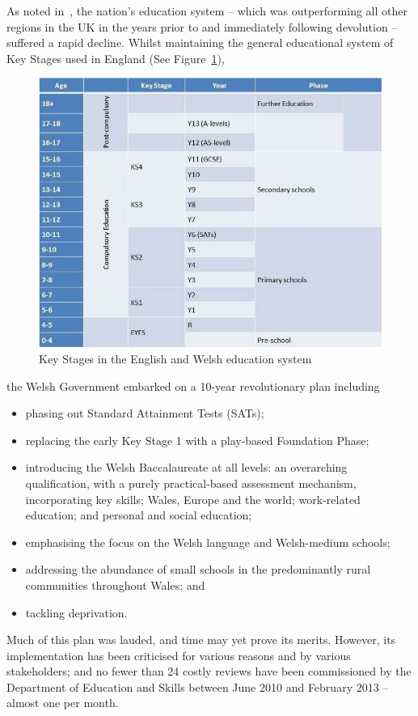 \documentclass{sig-alternate}
\begin{document}
As noted in~\cite{Evans:2015},
the nation's education system
-- which was outperforming all other regions in the UK
in the years prior to and immediately following devolution --
suffered a rapid decline.
Whilst maintaining the general educational system of Key Stages
used in England (See Figure~\ref{fig:key-stages}),
\begin{figure}
  \centering
  \includegraphics[width=\columnwidth]{images/keystages.png}
  \caption{Key Stages in the English and Welsh education system}
  \label{fig:key-stages}
\end{figure}
the Welsh Government embarked on a 10-year revolutionary plan
including
\begin{itemize}
\item
phasing out Standard Attainment Tests (SATs);
\item
replacing the early Key Stage 1 with
a play-based Foundation Phase;
\item
introducing the Welsh Baccalaureate at all levels:
an overarching qualification,
with a purely practical-based assessment mechanism,
incorporating
key skills; Wales, Europe and the world;
work-related education; and personal and social education;
\item
emphasising the focus on the Welsh language and  Welsh-medium schools;
\item
addressing the abundance of small schools in the 
predominantly rural communities throughout Wales;
and
\item
tackling deprivation.
\end{itemize}
Much of this plan was lauded, and time may yet prove its merits.
However, its implementation has been criticised
for various reasons and by various stakeholders;
and no fewer than 24 costly reviews have been commissioned
by the Department of Education and Skills
between June 2010 and February 2013 -- almost one per month.
\end{document}
